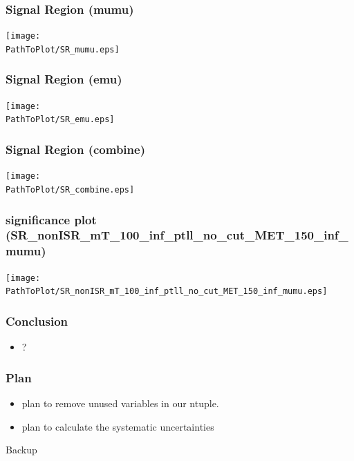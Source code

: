 \documentclass[mathserif,serif]{beamer}
\begin{document}
\begin{frame}
\frametitle{Signal Region (mumu)}
\texttt{[image: \\PathToPlot/SR\_mumu.eps]}
\end{frame}

\begin{frame}
\frametitle{Signal Region (emu)}
\texttt{[image: \\PathToPlot/SR\_emu.eps]}
\end{frame}

\begin{frame}
\frametitle{Signal Region (combine)}
\texttt{[image: \\PathToPlot/SR\_combine.eps]}
\end{frame}

\begin{frame}
\frametitle{significance plot (SR\_nonISR\_mT\_100\_inf\_ptll\_no\_cut\_MET\_150\_inf\_mumu)}
\texttt{[image: \\PathToPlot/SR\_nonISR\_mT\_100\_inf\_ptll\_no\_cut\_MET\_150\_inf\_mumu.eps]}
\end{frame}

%

\begin{frame}
\frametitle{Conclusion}
\begin{itemize}
\item ?
\end{itemize}
\end{frame}

\begin{frame}
\frametitle{Plan}
\begin{itemize}
\item plan to remove unused variables in our ntuple.
\item plan to calculate the systematic uncertainties
\end{itemize}
\end{frame}

\begin{frame}
\begin{center}
\huge
Backup
\end{center}
\end{frame}
\end{document}
